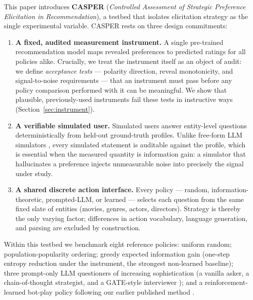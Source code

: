 \documentclass[11pt]{article}
\begin{document}
This paper introduces \textbf{CASPER} (\emph{Controlled Assessment of
Strategic Preference Elicitation in Recommendation}), a testbed that
isolates elicitation strategy as the single experimental variable. CASPER
rests on three design commitments:

\begin{enumerate}
  \item \textbf{A fixed, audited measurement instrument.} A single
  pre-trained recommendation model maps revealed preferences to predicted
  ratings for all policies alike. Crucially, we treat the instrument itself
  as an object of audit: we define \emph{acceptance tests} --- polarity
  direction, reveal monotonicity, and signal-to-noise requirements --- that
  an instrument must pass before any policy comparison performed with it
  can be meaningful. We show that plausible, previously-used instruments
  fail these tests in instructive ways (Section~\ref{sec:instrument}).
  \item \textbf{A verifiable simulated user.} Simulated users answer
  entity-level questions deterministically from held-out ground-truth
  profiles. Unlike free-form LLM simulators \citep{wang2023rethinking},
  every simulated statement is auditable against the profile, which is
  essential when the measured quantity is information gain: a simulator
  that hallucinates a preference injects unmeasurable noise into precisely
  the signal under study.
  \item \textbf{A shared discrete action interface.} Every policy ---
  random, information-theoretic, prompted-LLM, or learned --- selects each
  question from the same fixed slate of entities (movies, genres, actors,
  directors). Strategy is thereby the only varying factor; differences in
  action vocabulary, language generation, and parsing are excluded by
  construction.
\end{enumerate}

Within this testbed we benchmark eight reference policies: uniform random;
population-popularity ordering; greedy expected information gain (one-step
entropy reduction under the instrument, the strongest non-learned baseline);
three prompt-only LLM questioners of increasing sophistication (a vanilla
asker, a chain-of-thought strategist, and a GATE-style interviewer
\citep{li2023eliciting}); and a reinforcement-learned bot-play policy
following our earlier published method \citep{makarova2024learning}.
\end{document}
